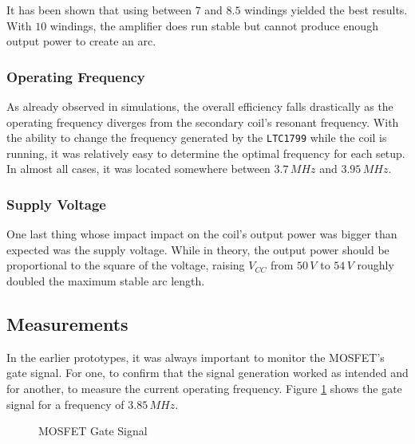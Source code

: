 It has been shown that using between \(7\) and \(8.5\) windings yielded the best results. With \(10\) windings, the amplifier does run stable but cannot produce enough output power to create an arc.

\subsubsection{Operating Frequency}

As already observed in simulations, the overall efficiency falls drastically as the operating frequency diverges from the secondary coil's resonant frequency. With the ability to change the frequency generated by the \texttt{LTC1799} while the coil is running, it was relatively easy to determine the optimal frequency for each setup. In almost all cases, it was located somewhere between \(3.7\,MHz\) and \(3.95\,MHz\).

\subsubsection{Supply Voltage}

One last thing whose impact impact on the coil's output power was bigger than expected was the supply voltage. While in theory, the output power should be proportional to the square of the voltage, raising \(V_{CC}\) from \(50\,V\) to \(54\,V\) roughly doubled the maximum stable arc length.


\subsection{Measurements}

In the earlier prototypes, it was always important to monitor the MOSFET's gate signal. For one, to confirm that the signal generation worked as intended and for another, to measure the current operating frequency. Figure \ref{fig:gate-measured} shows the gate signal for a frequency of \(3.85\,MHz\).

\begin{figure}[h!]
    \centering
    \caption{MOSFET Gate Signal}
    \label{fig:gate-measured}
\end{figure}

